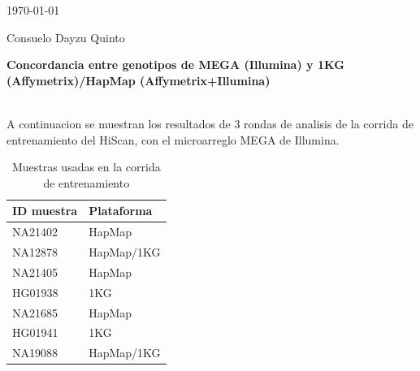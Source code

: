 \documentclass[11pt]{report}
\begin{document}
\today

Consuelo Dayzu Quinto

\begin{center}
\large \textbf{Concordancia entre genotipos de MEGA (Illumina) y 1KG (Affymetrix)/HapMap (Affymetrix+Illumina)}
\end{center}
\\

A continuacion se muestran los resultados de 3 rondas de analisis de la corrida de entrenamiento del HiScan, con el microarreglo MEGA de Illumina. 

\begin{table}[ht]
\centering
\caption{Muestras usadas en la corrida de entrenamiento}
\label{my-label}
\begin{tabular}{|l|l|}
\hline
\multicolumn{1}{|l|}{ID muestra} & \multicolumn{1}{l|}{Plataforma} \\ \hline \hline
NA21402 & HapMap \\
NA12878 & HapMap/1KG \\
NA21405 & HapMap \\
HG01938 & 1KG \\
NA21685 & HapMap \\
HG01941 & 1KG \\
NA19088 & HapMap/1KG\\ \hline
\end{tabular}
\end{table}
\end{document}
